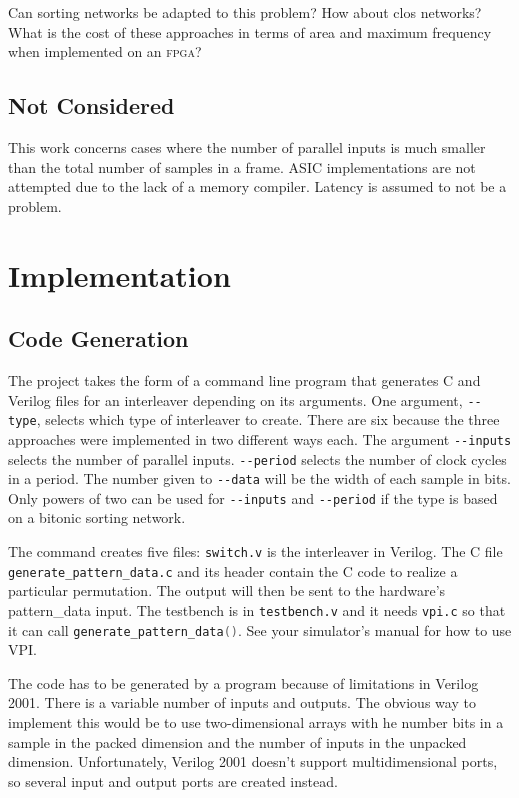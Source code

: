 \documentclass[
	utf8,
	largesmallcaps,
	intlimits,
	widermath,
	sharecounter,
	nobreak,
	definition=marks,
	numbers,
	noparts
]{rtthesis}
\let\textabbr\textsc
\newcommand{\abbrFPGA}{\texorpdfstring{\textabbr{fpga}}{FPGA}\xspace}
\begin{document}
Can sorting networks be adapted to this problem? How about clos networks? What
is the cost of these approaches in terms of area and maximum frequency when
implemented on an \abbrFPGA?

\section{Not Considered}

This work concerns cases where the number of parallel inputs is much smaller
than the total number of samples in a frame. ASIC implementations are not
attempted due to the lack of a memory compiler. Latency is assumed to not be a
problem.

\chapter{Implementation}

\section{Code Generation}

The project takes the form of a command line program that generates C and
Verilog files for an interleaver depending on its arguments. One argument,
\lstinline{--type}, selects which type of interleaver to create. There are six because the
three approaches were implemented in two different ways each. The argument
\lstinline{--inputs} selects the number of parallel inputs.
\lstinline{--period} selects the number of clock cycles in a period. The number
given to \lstinline{--data} will be the width of each sample in bits. Only
powers of two can be used for \lstinline{--inputs} and \lstinline{--period} if
the type is based on a bitonic sorting network.

The command creates five files: \lstinline{switch.v} is the interleaver in
Verilog. The C file \lstinline{generate_pattern_data.c} and its header contain
the C code to realize a particular permutation. The output will then be sent to
the hardware's pattern\_data input. The testbench is in \lstinline{testbench.v}
and it needs \lstinline{vpi.c} so that it can call
\lstinline[language=C]{generate_pattern_data()}. See your simulator's manual
for how to use VPI.

The code has to be generated by a program because of limitations in Verilog
2001. There is a variable number of inputs and outputs. The obvious way to
implement this would be to use two-dimensional arrays with he number bits in a
sample in the packed dimension and the number of inputs in the unpacked
dimension. Unfortunately, Verilog 2001 doesn't support multidimensional ports,
so several input and output ports are created instead.
\end{document}
